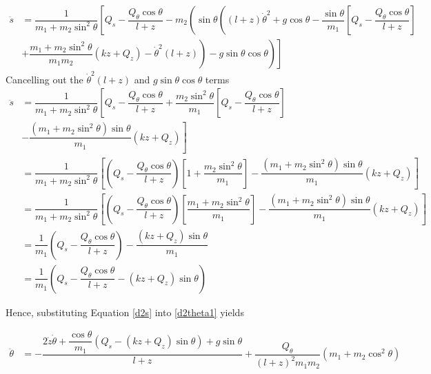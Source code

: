 \documentclass[12pt,a4paper,portrait]{article}
\begin{document}
	\begin{align*}
		\ddot{s} &= \dfrac{1}{m_1+m_2\sin^2{\theta}}\left[Q_s - \dfrac{Q_{\theta}\cos{\theta}}{l+z} - m_2\left(\sin{\theta}\left((l+z)\dot{\theta}^2+g\cos{\theta} - \dfrac{\sin{\theta}}{m_1}\left[Q_s - \dfrac{Q_{\theta}\cos{\theta}}{l+z} \right]\right.\right.\right.\\
		&\left.\left.\left.+\dfrac{m_1+m_2\sin^2{\theta}}{m_1m_2}\left(kz + Q_z\right)-\dot{\theta}^2(l+z)\right) - g\sin{\theta}\cos{\theta}\right)\right]
	\end{align*}
	Cancelling out the $\dot{\theta}^2(l+z)$ and $g\sin{\theta}\cos{\theta}$ terms
	\begin{align}
		\ddot{s} &= \dfrac{1}{m_1+m_2\sin^2{\theta}}\left[Q_s - \dfrac{Q_{\theta}\cos{\theta}}{l+z} +  \dfrac{m_2\sin^2{\theta}}{m_1}\left[Q_s - \dfrac{Q_{\theta}\cos{\theta}}{l+z} \right]\right.\nonumber\\
		&\left.-\dfrac{(m_1+m_2\sin^2{\theta})\sin{\theta}}{m_1}\left(kz + Q_z\right)\right]\nonumber\\
		&= \dfrac{1}{m_1+m_2\sin^2{\theta}}\left[\left(Q_s - \dfrac{Q_{\theta}\cos{\theta}}{l+z}\right)\left[1+\dfrac{m_2\sin^2{\theta}}{m_1}\right]-\dfrac{(m_1+m_2\sin^2{\theta})\sin{\theta}}{m_1}\left(kz + Q_z\right)\right]\nonumber\\
		&=  \dfrac{1}{m_1+m_2\sin^2{\theta}}\left[\left(Q_s - \dfrac{Q_{\theta}\cos{\theta}}{l+z}\right)\left[\dfrac{m_1+m_2\sin^2{\theta}}{m_1}\right]-\dfrac{(m_1+m_2\sin^2{\theta})\sin{\theta}}{m_1}\left(kz + Q_z\right)\right] \nonumber\\
		&= \dfrac{1}{m_1}\left(Q_s - \dfrac{Q_{\theta}\cos{\theta}}{l+z}\right) -\dfrac{(kz+Q_z)\sin{\theta}}{m_1} \nonumber\\
		&= \dfrac{1}{m_1}\left(Q_s - \dfrac{Q_{\theta}\cos{\theta}}{l+z}-(kz+Q_z)\sin{\theta}\right) \label{d2s}
	\end{align}
	
	Hence, substituting Equation \eqref{d2s} into \eqref{d2theta1} yields
	
	\begin{align*}
		\ddot{\theta} &= -\dfrac{2\dot{z}\dot{\theta}+\dfrac{\cos{\theta}}{m_1}\left(Q_s -(kz+Q_z)\sin{\theta}\right) + g\sin{\theta}}{l+z} + \dfrac{Q_{\theta}}{(l+z)^2m_1m_2}(m_1+m_2\cos^2{\theta})
	\end{align*}
\end{document}
